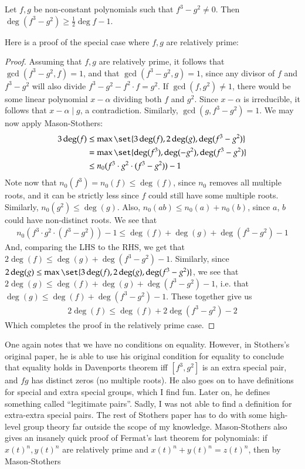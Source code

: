 \documentclass[12pt]{article}
\newenvironment{theorem}{\begin{mytheorem}}{\end{mytheorem}}
\theoremstyle{definitionstyle}
\begin{document}
\begin{theorem}[Davenport's theorem]
	Let $f,g$ be non-constant polynomials such that $f^3-g^2 \neq 0$. Then $\deg(f^3-g^2) \geq \frac12 \deg f - 1$.
\end{theorem}
Here is a proof of the special case where $f, g$ are relatively prime:
\begin{proof}
	Assuming that $f,g$ are relatively prime, it follows that $\gcd(f^3-g^2, f) = 1$, and that $\gcd(f^3-g^2, g) = 1$, since any divisor of $f$ and $f^3-g^2$ will also divide $f^3-g^2-f^2 \cdot f = g^2$. If $\gcd(f, g^2) \neq 1$, there would be some linear polynomial $x-\alpha$ dividing both $f$ and $g^2$. Since $x-\alpha$ is irreducible, it follows that $x-\alpha \mid g$, a contradiction. Similarly, $\gcd(g, f^3-g^2) = 1$. We may now apply Mason-Stothers: 
	\begin{align*}
		3\deg(f) &\leq \max\set{3\deg(f), 2\deg(g), \deg(f^3-g^2)} \\&=\max\set{\deg(f^3), \deg(-g^2), \deg(f^3-g^2)} \\&\leq n_0(f^3 \cdot g^2 \cdot (f^3-g^2)) - 1
	\end{align*}
	Note now that $n_0(f^3) = n_0(f) \leq \deg(f)$, since $n_0$ removes all multiple roots, and it can be strictly less since $f$ could still have some multiple roots. Similarly, $n_0(g^2) \leq \deg(g)$. Also, $n_0(ab) \leq n_0(a) + n_0(b)$, since $a$, $b$ could have non-distinct roots. We see that
	\begin{align*}
		n_0(f^3 \cdot g^2 \cdot (f^3-g^2)) - 1 \leq \deg(f) + \deg(g) + \deg(f^3-g^2) - 1
	\end{align*}
	And, comparing the LHS to the RHS, we get that $2\deg(f) \leq \deg(g) + \deg(f^3-g^2)-1$. Similarly, since $2\deg(g) \leq \max\set{3\deg(f), 2\deg(g), \deg(f^3-g^2)}$, we see that $2\deg(g) \leq \deg(f) + \deg(g) + \deg(f^3-g^2)-1$, i.e. that $\deg(g) \leq \deg(f) + \deg(f^3-g^2)-1$. These together give us
	\begin{align*}
		2\deg(f) \leq \deg(f) + 2\deg(f^3-g^2)-2
	\end{align*}
	Which completes the proof in the relatively prime case.
\end{proof}
One again notes that we have no conditions on equality. However, in Stothers's original paper, he is able to use his original condition for equality to conclude that equality holds in Davenports theorem iff $[f^3,g^2]$ is an extra special pair, and $fg$ has distinct zeros (no multiple roots). He also goes on to have definitions for special and extra special groups, which I find fun. Later on, he defines something called ``legitimate pairs''. Sadly, I was not able to find a definition for extra-extra special pairs. The rest of Stothers paper has to do with some high-level group theory far outside the scope of my knowledge. Mason-Stothers also gives an insanely quick proof of Fermat's last theorem for polynomials: if $x(t)^n, y(t)^n$ are relatively prime and $x(t)^n + y(t)^n = z(t)^n$, then by Mason-Stothers
\end{document}
